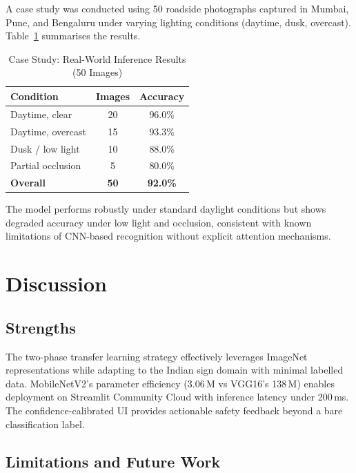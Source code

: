 \documentclass[journal,10pt,twocolumn]{IEEEtran}
\begin{document}
A case study was conducted using 50 roadside photographs captured in Mumbai,
Pune, and Bengaluru under varying lighting conditions (daytime, dusk, overcast).
Table~\ref{tab:casestudy} summarises the results.

\begin{table}[H]
\centering
\caption{Case Study: Real-World Inference Results (50 Images)}
\label{tab:casestudy}
\begin{tabular}{lcc}
\toprule
\textbf{Condition} & \textbf{Images} & \textbf{Accuracy} \\
\midrule
Daytime, clear        & 20 & 96.0\% \\
Daytime, overcast     & 15 & 93.3\% \\
Dusk / low light      & 10 & 88.0\% \\
Partial occlusion     &  5 & 80.0\% \\
\midrule
\textbf{Overall} & \textbf{50} & \textbf{92.0\%} \\
\bottomrule
\end{tabular}
\end{table}

The model performs robustly under standard daylight conditions but shows
degraded accuracy under low light and occlusion, consistent with known
limitations of CNN-based recognition without explicit attention mechanisms.

\section{Discussion}
\label{sec:discussion}

\subsection{Strengths}

The two-phase transfer learning strategy effectively leverages ImageNet
representations while adapting to the Indian sign domain with minimal labelled
data. MobileNetV2's parameter efficiency ($3.06$\,M vs VGG16's 138\,M) enables
deployment on Streamlit Community Cloud with inference latency under 200\,ms.
The confidence-calibrated UI provides actionable safety feedback beyond a bare
classification label.

\subsection{Limitations and Future Work}
\end{document}
